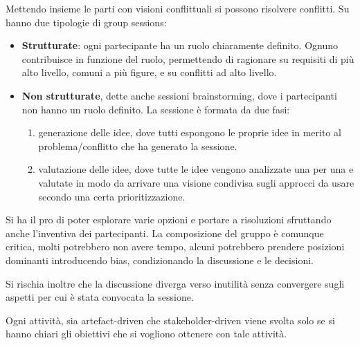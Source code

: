 \begin{itemize}
\begin{enumerate}
                    Mettendo insieme le parti con visioni conflittuali si possono risolvere
                    conflitti. Su hanno due tipologie di group sessions:
                    \begin{itemize}
                        \item \textbf{Strutturate}: ogni partecipante ha un ruolo chiaramente
                              definito. Ognuno contribuisce in funzione del ruolo, permettendo di
                              ragionare su requisiti di più alto livello, comuni a più figure, e
                              su conflitti ad alto livello.
                        \item \textbf{Non strutturate}, dette anche sessioni brainstorming,
                              dove i partecipanti non hanno un ruolo definito. La sessione è
                              formata da due fasi:
                              \begin{enumerate}
                                  \item generazione delle idee, dove tutti espongono le proprie
                                        idee in merito al problema/conflitto che ha generato la sessione.
                                  \item valutazione delle idee, dove tutte le idee vengono analizzate
                                        una per una e valutate in modo da arrivare una visione condivisa
                                        sugli approcci da usare secondo una certa prioritizzazione.
                              \end{enumerate}
                    \end{itemize}

                    Si ha il pro di poter esplorare varie opzioni e portare a risoluzioni
                    sfruttando anche l'inventiva dei partecipanti. La composizione del gruppo
                    è comunque critica, molti potrebbero non avere tempo, alcuni potrebbero
                    prendere posizioni dominanti introducendo bias, condizionando la discussione e
                    le decisioni.

                    Si rischia inoltre che la discussione diverga verso inutilità
                    senza convergere sugli aspetti per cui è stata convocata la
                    sessione.
          \end{enumerate}
\end{itemize}
Ogni attività, sia artefact-driven che stakeholder-driven viene svolta solo se
si hanno chiari gli obiettivi che si vogliono ottenere con tale attività.

